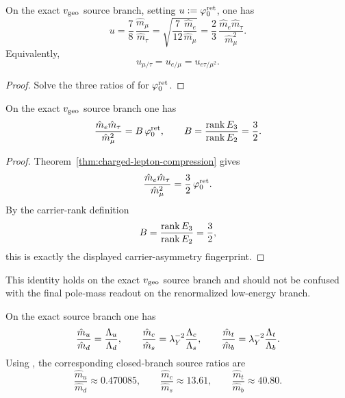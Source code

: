 \begin{corollary}
\label{cor:charged-lepton-seed-decoder}
On the exact $v_{\mathrm{geo}}$ source branch, setting $u:=\varphi_0^{\mathrm{ret}}$, one has
\[
u
=
\frac78\,\frac{\hat m_\mu}{\hat m_\tau}
=
\sqrt{\frac7{12}\frac{\hat m_e}{\hat m_\mu}}
=
\frac23\,\frac{\hat m_e\hat m_\tau}{\hat m_\mu^2}.
\]
Equivalently,
\[
u_{\mu/\tau}=u_{e/\mu}=u_{e\tau/\mu^2}.
\]
\end{corollary}

\begin{proof}
Solve the three ratios of  for $\varphi_0^{\mathrm{ret}}$.
\end{proof}

\begin{corollary}
\label{cor:carrier-asymmetry-leptons}
On the exact $v_{\mathrm{geo}}$ source branch one has
\[
\frac{\hat m_e \hat m_\tau}{\hat m_\mu^2}=B\,\varphi_0^{\mathrm{ret}},
\qquad
B=\frac{\operatorname{rank} E_3}{\operatorname{rank} E_2}=\frac32.
\]
\end{corollary}

\begin{proof}
Theorem~\ref{thm:charged-lepton-compression} gives
\[
\frac{\hat m_e \hat m_\tau}{\hat m_\mu^2}=\frac32\,\varphi_0^{\mathrm{ret}}.
\]
By the carrier-rank definition
\[
B=\frac{\operatorname{rank} E_3}{\operatorname{rank} E_2}=\frac32,
\]
this is exactly the displayed carrier-asymmetry fingerprint.
\end{proof}

\begin{remark}
This identity holds on the exact $v_{\mathrm{geo}}$ source branch and should not be confused with the final
pole-mass readout on the renormalized low-energy branch.
\end{remark}

\begin{corollary}
\label{cor:quark-source-ratios}
On the exact source branch one has
\[
\frac{\hat m_u}{\hat m_d}=\frac{\Lambda_u}{\Lambda_d},
\qquad
\frac{\hat m_c}{\hat m_s}=\lambda_Y^{-2}\frac{\Lambda_c}{\Lambda_s},
\qquad
\frac{\hat m_t}{\hat m_b}=\lambda_Y^{-2}\frac{\Lambda_t}{\Lambda_b}.
\]
Using , the corresponding closed-branch source ratios are
\[
\frac{\hat m_u}{\hat m_d}\approx\num{0.470085},
\qquad
\frac{\hat m_c}{\hat m_s}\approx\num{13.61},
\qquad
\frac{\hat m_t}{\hat m_b}\approx\num{40.80}.
\]
\end{corollary}

